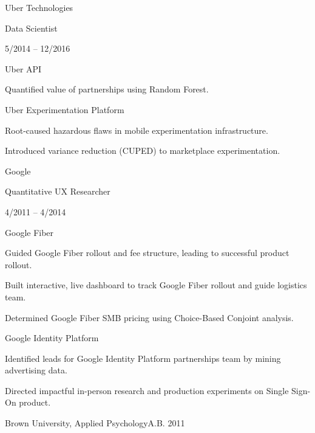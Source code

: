 \documentclass[12pt]{res}
\newcommand\textbox[1]{%
  \parbox{.4\textwidth}{#1}%
}
\begin{document}
{\begin{resume}
\begin{list}{}{\leftmargin=1em}
{\begin{list}{}{\leftmargin=1em}
\item \textbox{Uber Technologies\dotfill}\textbox{Data Scientist\dotfill}\textbox{5/2014 -- 12/2016}
\begin{list}{}{\leftmargin=1em}
\item Uber API
\begin{list}{-}{\leftmargin=1em}
\item Quantified value of partnerships using Random Forest.
\end{list}
\item Uber Experimentation Platform
\begin{list}{-}{\leftmargin=1em}
\item Root-caused hazardous flaws in mobile experimentation infrastructure.
\item Introduced variance reduction (CUPED) to marketplace experimentation.
\end{list}
\end{list}
\vspace{4mm}
\item \textbox{Google\dotfill}\textbox{Quantitative UX Researcher\dotfill}\textbox{4/2011 -- 4/2014}
\begin{list}{}{\leftmargin=1em}
\item Google Fiber
\begin{list}{-}{\leftmargin=1em}
\item Guided Google Fiber rollout and fee structure, leading to successful product rollout.
\item Built interactive, live dashboard to track Google Fiber rollout and guide logistics team.
\item Determined Google Fiber SMB pricing using Choice-Based Conjoint analysis.
\end{list}
\item Google Identity Platform
\begin{list}{-}{\leftmargin=1em}
\item Identified leads for Google Identity Platform partnerships team by mining advertising data.
\item Directed impactful in-person research and production experiments on Single Sign-On product.
\end{list}
\end{list}
\end{list}}
\item{
\vspace{6mm}
\begin{list}{}{\leftmargin=1em}
\item Brown University, Applied Psychology\dotfill A.B. 2011
\end{list}}
\end{list}
\vspace{7mm}

\end{resume}
} %
\end{document}
